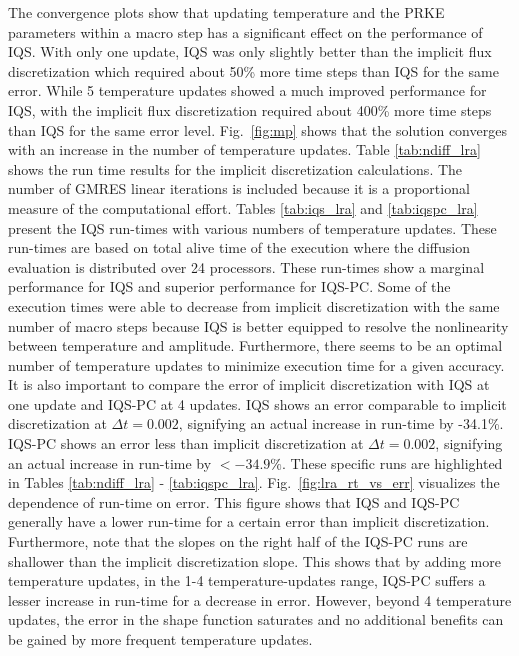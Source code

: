 \documentclass{elsarticle}
\newcommand{\fig}[1]{Fig.~\ref{#1}}                      %
\newcommand{\iqspc}{IQS-PC\xspace}
\begin{document}
The convergence plots show that updating temperature and the PRKE parameters within a macro step has a significant effect on the performance of IQS.  With only one update, IQS was only slightly better than the implicit flux discretization which required about 50\% more time steps than IQS for the same error.  While 5 temperature updates showed a much improved performance for IQS, with the implicit flux discretization required about 400\% more time steps than IQS for the same error level.  \fig{fig:mp} shows that the solution converges with an increase in the number of temperature updates. 
%
Table \ref{tab:ndiff_lra} shows the run time results for the implicit discretization calculations. The number of GMRES linear iterations is included because it is a proportional measure of the computational effort. Tables \ref{tab:iqs_lra} and \ref{tab:iqspc_lra} present the IQS run-times with various numbers of temperature updates.  These run-times are based on total alive time of the execution where the diffusion evaluation is distributed over 24 processors. These run-times show a marginal performance for IQS and superior performance for \iqspc.  Some of the execution times were able to decrease from implicit discretization with the same number of macro steps because IQS is better equipped to resolve the nonlinearity between temperature and amplitude. Furthermore, there seems to be an optimal number of temperature updates to minimize execution time for a given accuracy.
It is also important to compare the error of implicit discretization with IQS at one update and \iqspc at 4 updates.  IQS shows an error comparable to implicit discretization at $\Delta t = 0.002$, signifying an actual increase in run-time by -34.1\%.  \iqspc shows an error less than implicit discretization at $\Delta t = 0.002$, signifying an actual increase in run-time by $<-34.9\%$. These specific runs are highlighted in Tables \ref{tab:ndiff_lra} - \ref{tab:iqspc_lra}.
\fig{fig:lra_rt_vs_err} visualizes the dependence of run-time on error. This figure shows that IQS and \iqspc generally have a lower run-time for a certain error than implicit discretization. Furthermore, note that the slopes on the right half of the \iqspc runs are shallower than the implicit discretization slope. This shows that by adding more temperature updates, in the 1-4 temperature-updates range, \iqspc suffers a lesser increase in run-time for a decrease in error. However, beyond 4 temperature updates, the error in the shape function saturates and no additional benefits can be gained by more frequent temperature updates. 
\end{document}
